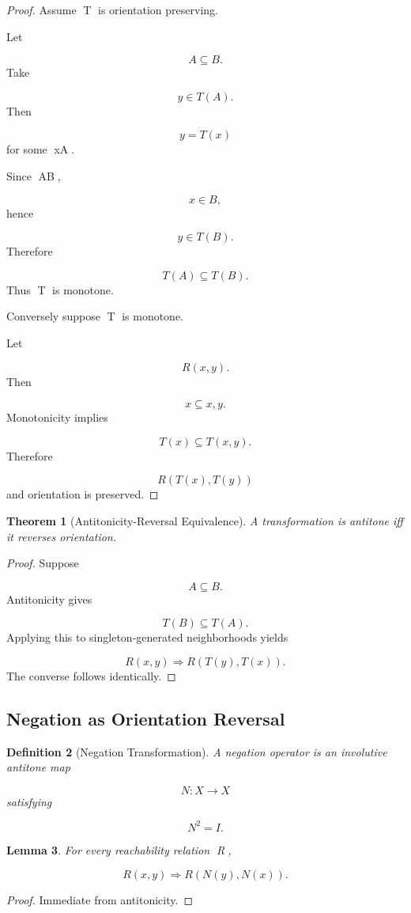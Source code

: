 \documentclass[12pt]{article}
\newtheorem{theorem}{Theorem}[section]
\newtheorem{lemma}[theorem]{Lemma}
\newtheorem{definition}[theorem]{Definition}
\theoremstyle{remark}
\begin{document}
\begin{proof}
Assume T is orientation preserving.

Let

\[
A\subseteq B.
\]
Take

\[
y\in T(A).
\]
Then

\[
y=T(x)
\]
for some x\in A.

Since A\subseteq B,

\[
x\in B,
\]
hence

\[
y\in T(B).
\]
Therefore

\[
T(A)\subseteq T(B).
\]
Thus T is monotone.

Conversely suppose T is monotone.

Let

\[
R(x,y).
\]
Then

\[
{x}\subseteq {x,y}.
\]
Monotonicity implies

\[
T({x})
\subseteq
T({x,y}).
\]
Therefore

\[
R(T(x),T(y))
\]
and orientation is preserved.
\end{proof}

\begin{theorem}[Antitonicity-Reversal Equivalence]
A transformation is antitone iff it reverses orientation.
\end{theorem}

\begin{proof}
Suppose

\[
A\subseteq B.
\]
Antitonicity gives

\[
T(B)\subseteq T(A).
\]
Applying this to singleton-generated neighborhoods yields

\[
R(x,y)
\Longrightarrow
R(T(y),T(x)).
\]
The converse follows identically.
\end{proof}

\subsection{Negation as Orientation Reversal}

\begin{definition}[Negation Transformation]
A negation operator is an involutive antitone map

\[
N:X\rightarrow X
\]
satisfying

\[
N^2=I.
\]
\end{definition}
\begin{lemma}
For every reachability relation R,

\[
R(x,y)
\Longrightarrow
R(N(y),N(x)).
\]
\end{lemma}
\begin{proof}
Immediate from antitonicity.
\end{proof}
\end{document}
